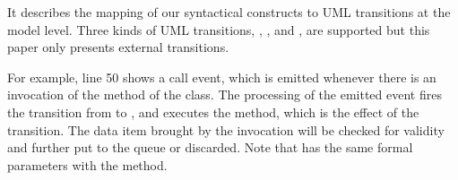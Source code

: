 

\noindent
{}
It describes the mapping of our syntactical constructs to UML transitions at the model level. 
Three kinds of UML transitions, , , and , are supported but this paper only presents external transitions.

For example, line 50 shows a call event, which is emitted whenever there is an invocation of the  method of the  class. 
The processing of the emitted event fires the transition from  to , and executes the  method, which is the effect of the transition.
The data item brought by the invocation will be checked for validity and further put to the queue or discarded.
Note that  has the same formal parameters with the  method.


